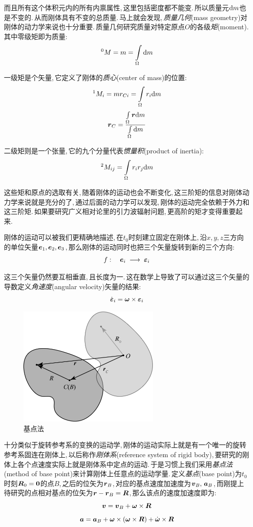 而且所有这个体积元内的所有内禀属性,\,这里包括密度都不能变.\,所以质量元$\textrm{d} m$也是不变的.\,从而刚体具有不变的总质量.\,马上就会发现,\,\emph{质量几何}(mass geometry)对刚体的动力学来说也十分重要.\,质量几何研究质量对特定原点$O$的各级\emph{矩}(moment).\,其中零级矩即为质量:
\[\phantom{}^0M=m=\int\limits_\Omega \textrm{d} m\]

一级矩是个矢量,\,它定义了刚体的\emph{质心}(center of mass)的位置:
\[\phantom{}^1M_i=mr_{Ci}=\int\limits_\Omega r_i\textrm{d} m\]
\[\boldsymbol{r}_C=\frac{\int\limits_\Omega \boldsymbol{r}\textrm{d} m}{\int\limits_\Omega \textrm{d} m}\]

二级矩则是一个张量,\,它的九个分量代表\emph{惯量积}(product of inertia):
\[\phantom{}^2M_{ij}=\int\limits_\Omega r_ir_j\textrm{d} m\]

这些矩和原点的选取有关,\,随着刚体的运动也会不断变化,\,这三阶矩的信息对刚体动力学来说就是充分的了,\,通过后面的动力学可以发现,\,刚体的运动完全依赖于外力和这三阶矩.\,如果要研究广义相对论里的引力波辐射问题,\,更高阶的矩才变得重要起来.

刚体的运动可以被我们更精确地描述,\,在$t_0$时刻建立固定在刚体上,\,沿$x,y,z$三方向的单位矢量$\boldsymbol{e}_1,\boldsymbol{e}_2,\boldsymbol{e}_3$,\,那么刚体的运动同时也把三个矢量旋转到新的三个方向:
\[f:\quad \boldsymbol{e}_i\;\longrightarrow\; \boldsymbol{\varepsilon}_i\]

这三个矢量仍然要互相垂直,\,且长度为一.\,这在数学上导致了可以通过这三个矢量的导数定义\emph{角速度}(angular velocity)矢量的结果:
\[\dot{\boldsymbol{\varepsilon}}_i=\boldsymbol{\omega}\times\boldsymbol{\varepsilon}_i\]

\begin{figure}
\vspace{-0.7cm}
\centering
\includegraphics[width=7cm]{image/6-6-2.png}
\caption{基点法}
\end{figure}
十分类似于旋转参考系的变换的运动学,\,刚体的运动实际上就是有一个唯一的旋转参考系固连在刚体上,\,以后称作\emph{刚体系}(reference system of rigid body),\,要研究的刚体上各个点速度实际上就是刚体系中定点的运动.\,于是习惯上我们采用\emph{基点法}(method of base point)来计算刚体上任意点的运动学量.\,定义\emph{基点}(base point)为$t_0$时刻$\boldsymbol{R}_0=\boldsymbol{0}$的点$B$,\,之后的位矢为$\boldsymbol{r}_B$,\,对应的基点速度加速度为$\boldsymbol{v}_B,\,\boldsymbol{a}_B$,\,而刚提上待研究的点相对基点的位矢为$\boldsymbol{r}-\boldsymbol{r}_B=\boldsymbol{R}$,\,那么该点的速度加速度即为:
\[\boldsymbol{v}=\boldsymbol{v}_B+\boldsymbol{\omega}\times\boldsymbol{R}\]
\[\boldsymbol{a}=\boldsymbol{a}_B+\boldsymbol{\omega}\times(\boldsymbol{\omega}\times\boldsymbol{R})+\dot{\boldsymbol{\omega}}\times\boldsymbol{R}\]

